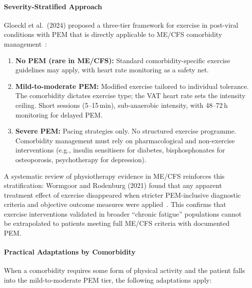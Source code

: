 \paragraph{Severity-Stratified Approach}

Gloeckl et al.\ (2024) proposed a three-tier framework for exercise in
post-viral conditions with PEM that is directly applicable to ME/CFS
comorbidity management~\cite{Gloeckl2024LCexercise}:

\begin{enumerate}
    \item \textbf{No PEM (rare in ME/CFS):} Standard comorbidity-specific
      exercise guidelines may apply, with heart rate monitoring as a safety
      net.
    \item \textbf{Mild-to-moderate PEM:} Modified exercise tailored to
      individual tolerance. The comorbidity dictates exercise type; the VAT
      heart rate sets the intensity ceiling. Short sessions (5--15\,min),
      sub-anaerobic intensity, with 48--72\,h monitoring for delayed PEM.
    \item \textbf{Severe PEM:} Pacing strategies only. No structured exercise
      programme. Comorbidity management must rely on pharmacological and
      non-exercise interventions (e.g., insulin sensitisers for diabetes,
      bisphosphonates for osteoporosis, psychotherapy for depression).
\end{enumerate}

A systematic review of physiotherapy evidence in ME/CFS reinforces this
stratification: Wormgoor and Rodenburg (2021) found that any apparent
treatment effect of exercise disappeared when stricter PEM-inclusive
diagnostic criteria and objective outcome measures were
applied~\cite{Wormgoor2021physio}. This confirms that exercise interventions
validated in broader ``chronic fatigue'' populations cannot be extrapolated to
patients meeting full ME/CFS criteria with documented PEM.

\paragraph{Practical Adaptations by Comorbidity}

When a comorbidity requires some form of physical activity and the patient
falls into the mild-to-moderate PEM tier, the following adaptations apply:


